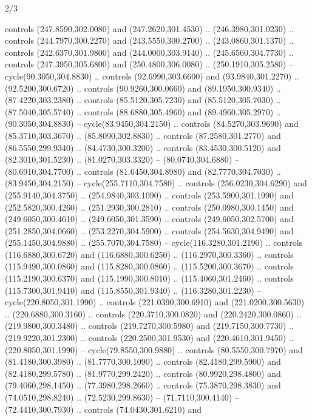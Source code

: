 \begin{flagdescription}{2/3}
\begin{scope}[xshift=0.5\flaglength,yshift=0.5\flagwidth,scale=\stretchfactor]
\begin{scope}[scale=0.001645\flagwidth,yshift=65mm,xshift=-63mm]
\begin{scope}[y=0.80pt, x=0.80pt, yscale=-1,]
\begin{scope}[cm={{1.33333,0.0,0.0,1.33333,(0.0,1e-05)}}]
  controls (247.8590,302.0080) and (247.2620,301.4530) .. (246.3980,301.0230) ..
  controls (244.7970,300.2270) and (243.5550,300.2700) .. (243.0860,301.1370) ..
  controls (242.6370,301.9800) and (244.0000,303.9140) .. (245.6560,304.7730) ..
  controls (247.3950,305.6800) and (250.4800,306.0080) .. (250.1910,305.2580) --
  cycle(90.3050,304.8830) .. controls (92.6990,303.6600) and (93.9840,301.2270)
  .. (92.5200,300.6720) .. controls (90.9260,300.0660) and (89.1950,300.9340) ..
  (87.4220,303.2380) .. controls (85.5120,305.7230) and (85.5120,305.7030) ..
  (87.5040,305.5740) .. controls (88.6880,305.4960) and (89.4960,305.2970) ..
  (90.3050,304.8830) -- cycle(83.9450,304.2150) .. controls (84.5270,303.9690)
  and (85.3710,303.3670) .. (85.8090,302.8830) .. controls (87.2580,301.2770)
  and (86.5550,299.9340) .. (84.4730,300.3200) .. controls (83.4530,300.5120)
  and (82.3010,301.5230) .. (81.0270,303.3320) -- (80.0740,304.6880) --
  (80.6910,304.7700) .. controls (81.6450,304.8980) and (82.7770,304.7030) ..
  (83.9450,304.2150) -- cycle(255.7110,304.7580) .. controls (256.0230,304.6290)
  and (255.9140,304.3750) .. (254.9840,303.1090) .. controls (253.5900,301.1990)
  and (252.5820,300.4260) .. (251.2930,300.2810) .. controls (250.0980,300.1450)
  and (249.6050,300.4610) .. (249.6050,301.3590) .. controls (249.6050,302.5700)
  and (251.2850,304.0660) .. (253.2270,304.5900) .. controls (254.5630,304.9490)
  and (255.1450,304.9880) .. (255.7070,304.7580) -- cycle(116.3280,301.2190) ..
  controls (116.6880,300.6720) and (116.6880,300.6250) .. (116.2970,300.3360) ..
  controls (115.9490,300.0860) and (115.8280,300.0860) .. (115.5200,300.3670) ..
  controls (115.2190,300.6370) and (115.1990,300.8010) .. (115.4060,301.2460) ..
  controls (115.7300,301.9410) and (115.8550,301.9340) .. (116.3280,301.2230) --
  cycle(220.8050,301.1990) .. controls (221.0390,300.6910) and
  (221.0200,300.5630) .. (220.6880,300.3160) .. controls (220.3710,300.0820) and
  (220.2420,300.0860) .. (219.9800,300.3480) .. controls (219.7270,300.5980) and
  (219.7150,300.7730) .. (219.9220,301.2300) .. controls (220.2500,301.9530) and
  (220.4610,301.9450) .. (220.8050,301.1990) -- cycle(79.8550,300.9880) ..
  controls (80.5550,300.7970) and (81.4180,300.3980) .. (81.7770,300.1090) ..
  controls (82.4180,299.5900) and (82.4180,299.5780) .. (81.9770,299.2420) ..
  controls (80.9920,298.4800) and (79.4060,298.1450) .. (77.3980,298.2660) ..
  controls (75.3870,298.3830) and (74.0510,298.8240) .. (72.5230,299.8630) --
  (71.7110,300.4140) -- (72.4410,300.7930) .. controls (74.0430,301.6210) and

\end{scope}
\end{scope}
\end{scope}
\end{scope}
\end{flagdescription}
